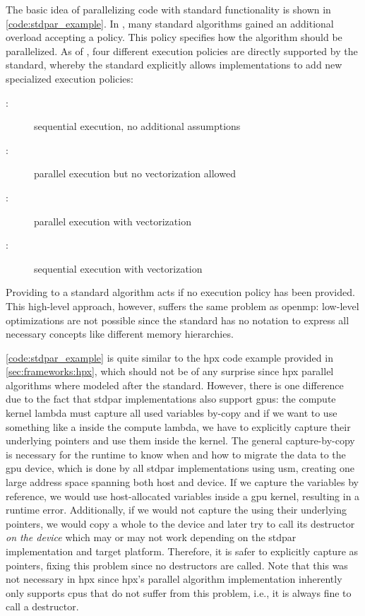 The basic idea of parallelizing code with \cpp standard functionality is shown in \autoref{code:stdpar_example}. 
In , many standard algorithms gained an additional overload accepting a  policy. 
This policy specifies how the algorithm should be parallelized. 
As of , four different execution policies are directly supported by the standard, whereby the \cpp standard explicitly allows implementations to add new specialized execution policies:
\begin{description}
    \item[:] sequential execution, no additional assumptions
    \item[:] parallel execution but no vectorization allowed
    \item[:] parallel execution with vectorization
    \item[:] sequential execution with vectorization
\end{description}
Providing  to a \cpp standard algorithm acts if no execution policy has been provided. 
This high-level approach, however, suffers the same problem as \gls{openmp}: low-level optimizations are not possible since the \cpp standard has no notation to express all necessary concepts like different memory hierarchies. 

\autoref{code:stdpar_example} is quite similar to the \gls{hpx} code example provided in \autoref{sec:frameworks:hpx}, which should not be of any surprise since \gls{hpx} parallel algorithms where modeled after the \cpp standard. 
However, there is one difference due to the fact that stdpar implementations also support \glspl{gpu}: the compute kernel lambda must capture all used variables by-copy and if we want to use something like a  inside the compute lambda, we have to explicitly capture their underlying pointers and use them inside the kernel. 
The general capture-by-copy is necessary for the runtime to know when and how to migrate the data to the \gls{gpu} device, which is done by all stdpar implementations using \gls{usm}, creating one large address space spanning both host and device. 
If we capture the variables by reference, we would use host-allocated variables inside a \gls{gpu} kernel, resulting in a runtime error. 
Additionally, if we would not capture the  using their underlying pointers, we would copy a whole  to the device and later try to call its destructor \textit{on the device} which may or may not work depending on the stdpar implementation and target platform. 
Therefore, it is safer to explicitly capture  as pointers, fixing this problem since no destructors are called. 
Note that this was not necessary in \gls{hpx} since \gls{hpx}'s parallel algorithm implementation inherently only supports \glspl{cpu} that do not suffer from this problem, i.e., it is always fine to call a destructor. 

